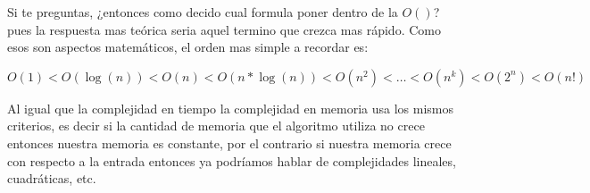  Si te preguntas, ¿entonces como decido cual formula poner dentro de la $O()$? pues la respuesta mas teórica seria aquel termino que crezca mas rápido. Como esos son aspectos matemáticos, el orden mas simple a recordar es: 
 
 $$O(1) < O(\log(n)) < O(n) < O(n*\log(n)) < O(n^2) < \dots < O(n^k) < O(2^n) < O(n!)$$
 
 Al igual que la complejidad en tiempo la complejidad en memoria usa los mismos criterios, es decir si la cantidad de memoria que el algoritmo utiliza no crece entonces nuestra memoria es constante, por el contrario si nuestra memoria crece con respecto a la entrada entonces ya podríamos hablar de complejidades lineales, cuadráticas, etc.


